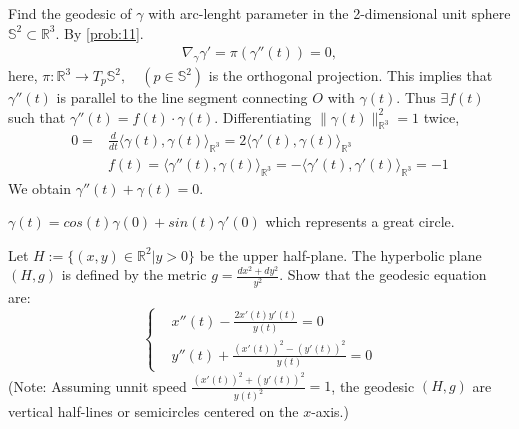 \begin{example}
    Find the geodesic of $\gamma$ with arc-lenght parameter in the 2-dimensional unit sphere 
    $\mathbb{S}^2 \subset \mathbb{R}^3$. By \autoref{prob:11}.
    \[
    \begin{aligned}
        \nabla_{\gamma} \gamma' = \pi (\gamma''(t)) = 0,
    \end{aligned}
    \]
    here, $\pi : \mathbb{R}^3 \to T_p \mathbb{S}^2, \quad (p \in \mathbb{S}^2)$ is the orthogonal projection.
    This implies that $\gamma''(t)$ is parallel to the line segment connecting $O$ with $\gamma(t)$. Thus $\exists f(t)$ such that
    $\gamma''(t) = f(t) \cdot \gamma(t)$.
    Differentiating $\|\gamma(t)\|^2_{\mathbb{R}^3} = 1$ twice,
    \[
    \begin{aligned}
        0 =& \frac{d}{dt} \langle \gamma(t), \gamma(t) \rangle_{\mathbb{R}^3} = 2 \langle \gamma'(t), \gamma(t) \rangle_{\mathbb{R}^3} \\
        &f(t) = \langle \gamma''(t), \gamma(t) \rangle_{\mathbb{R}^3} = - \langle \gamma'(t), \gamma'(t) \rangle_{\mathbb{R}^3} = -1
    \end{aligned}
    \]
    We obtain $\gamma''(t) + \gamma(t) = 0$. 

    $\gamma(t) = cos(t) \gamma(0) + sin(t) \gamma'(0)$ which represents a great circle.
\end{example}

\begin{problem}
    Let $H:= \{(x,y) \in \mathbb{R}^2 | y>0 \}$ be the upper half-plane.
    The hyperbolic plane $(H,g)$ is defined by the metric $g = \frac{dx^2+ dy^2}{y^2}$.
    Show that the geodesic equation are:
    \[
    \left\{
    \begin{array}{ll}
        &x''(t)- \frac{2 x'(t) y'(t)}{y(t)} = 0 \\
        &y''(t)+ \frac{(x'(t))^2 - (y'(t))^2}{y(t)} = 0
    \end{array} 
    \right.
    \]
    (Note: Assuming unnit speed $\frac{(x'(t))^2 + (y'(t))^2}{y(t)^2} = 1$, the geodesic $(H,g)$ are vertical half-lines or semicircles centered on the $x$-axis.)
     \label{prob:12}
\end{problem}